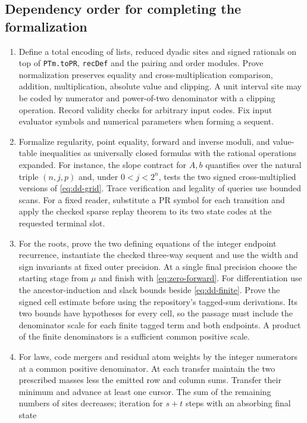 \subsection{Dependency order for completing the formalization}

\begin{enumerate}[leftmargin=*]
\item Define a total encoding of lists, reduced dyadic sites and signed
rationals on top of \texttt{PTm.toPR}, \texttt{recDef} and the pairing and
order modules. Prove normalization preserves equality and cross-multiplication
comparison, addition, multiplication, absolute value and clipping. A unit
interval site may be coded by numerator and power-of-two denominator with a
clipping operation. Record validity checks for arbitrary input codes. Fix input
evaluator symbols and numerical parameters when forming a sequent.
\item Formalize regularity, point equality, forward and inverse moduli, and
value-table inequalities as universally closed formulas with the rational
operations expanded. For instance, the slope contract for $A,b$ quantifies
over the natural triple $(n,j,p)$ and, under $0<j<2^n$, tests the two signed
cross-multiplied versions of \eqref{eq:dd-grid}. Trace verification and legality
of queries use bounded scans. For a fixed reader, substitute a PR symbol for
each transition and apply the checked sparse replay theorem to its two state codes at the requested terminal slot.
\item For the roots, prove the two defining equations of the integer endpoint
recurrence, instantiate the checked three-way sequent and use the width and
sign invariants at fixed outer precision. At a single final precision choose
the starting stage from $\mu$ and finish with \eqref{eq:zero-forward}.
For differentiation use the ancestor-induction and slack bounds beside
\eqref{eq:dd-finite}. Prove the signed cell estimate before using the
repository's tagged-sum derivations. Its two bounds have hypotheses for every
cell, so the passage must include the denominator scale for each finite
tagged term and both endpoints. A product of the finite denominators is a
sufficient common positive scale.
\item For laws, code mergers and residual atom weights by the integer
numerators at a common positive denominator. At each transfer maintain the
two prescribed masses less the emitted row and column sums. Transfer their
minimum and advance at least one cursor. The sum of the remaining numbers of
sites decreases; iteration for $s+t$ steps with an absorbing final state

\end{enumerate}
